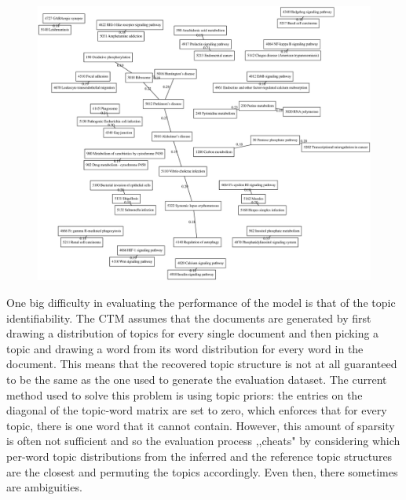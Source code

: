 \documentclass[12pt,a4]{article}
\begin{document}
\begin{figure}[!htb]
\includegraphics[width=\textwidth]{progress-report-pathways.eps}
\label{Sample graph of pathway correlations (only pathways that have correlations greater than 0.17 are plotted). The model correctly identifies some important phenomena such as the relation between neurodegenerative diseases (Parkinson's, Huntington's, Alzheimer's), the relation between pyrine and pyrimidine (similar molecular structures) metabolism or the association of the hedgehog signalling pathway with basal cell carcinomas.}
\end{figure}

One big difficulty in evaluating the performance of the model is that of the topic identifiability. The CTM assumes that the documents are generated by first drawing a distribution of topics for every single document and then picking a topic and drawing a word from its word distribution for every word in the document. This means that the recovered topic structure is not at all guaranteed to be the same as the one used to generate the evaluation dataset. The current method used to solve this problem is using topic priors: the entries on the diagonal of the topic-word matrix are set to zero, which enforces that for every topic, there is one word that it cannot contain. However, this amount of sparsity is often not sufficient and so the evaluation process
,,cheats" by considering which per-word topic distributions from the inferred and the reference topic structures are the closest and permuting the topics accordingly. Even then, there sometimes are ambiguities.
\end{document}
